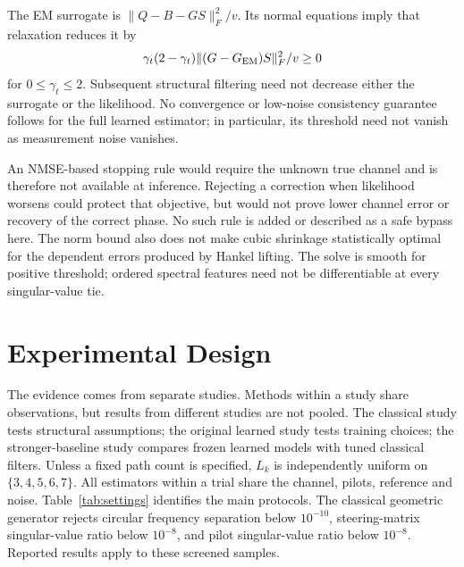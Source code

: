 \documentclass[10pt,journal,letterpaper]{IEEEtran}
\begin{document}
The EM surrogate is $\|Q-B-GS\|_F^2/v$. Its normal equations imply that relaxation reduces it by
\begin{equation}
 \gamma_t(2-\gamma_t)\|(G-G_{\rm EM})S\|_F^2/v\ge0
\end{equation}
for $0\le\gamma_t\le2$. Subsequent structural filtering need not decrease either the surrogate or the likelihood. No convergence or low-noise consistency guarantee follows for the full learned estimator; in particular, its threshold need not vanish as measurement noise vanishes.

An NMSE-based stopping rule would require the unknown true channel and is therefore not available at inference. Rejecting a correction when likelihood worsens could protect that objective, but would not prove lower channel error or recovery of the correct phase. No such rule is added or described as a safe bypass here. The norm bound also does not make cubic shrinkage statistically optimal for the dependent errors produced by Hankel lifting. The solve is smooth for positive threshold; ordered spectral features need not be differentiable at every singular-value tie.

\section{Experimental Design}
\label{sec:experiments}
The evidence comes from separate studies. Methods within a study share observations, but results from different studies are not pooled. The classical study tests structural assumptions; the original learned study tests training choices; the stronger-baseline study compares frozen learned models with tuned classical filters. Unless a fixed path count is specified, $L_k$ is independently uniform on $\{3,4,5,6,7\}$. All estimators within a trial share the channel, pilots, reference and noise. Table~\ref{tab:settings} identifies the main protocols. The classical geometric generator rejects circular frequency separation below $10^{-10}$, steering-matrix singular-value ratio below $10^{-8}$, and pilot singular-value ratio below $10^{-8}$. Reported results apply to these screened samples.
\end{document}
